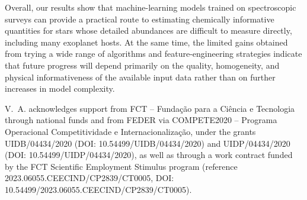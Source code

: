 \documentclass{aa}
\begin{document}
Overall, our results show that machine-learning models trained on spectroscopic surveys can provide a practical route to estimating chemically informative quantities for stars whose detailed abundances are difficult to measure directly, including many exoplanet hosts. At the same time, the limited gains obtained from trying a wide range of algorithms and feature-engineering strategies indicate that future progress will depend primarily on the quality, homogeneity, and physical informativeness of the available input data rather than on further increases in model complexity.

\begin{acknowledgements}
V.~A. acknowledges support from FCT – Funda\c{c}\~ao para a Ci\^encia e Tecnologia through national funds and from FEDER via COMPETE2020 – Programa Operacional Competitividade e Internacionalização, under the grants UIDB/04434/2020 (DOI: 10.54499/UIDB/04434/2020) and UIDP/04434/2020 (DOI: 10.54499/UIDP/04434/2020), as well as through a work contract funded by the FCT Scientific Employment Stimulus program (reference 2023.06055.CEECIND/CP2839/CT0005, DOI: 10.54499/2023.06055.CEECIND/CP2839/CT0005).
\end{acknowledgements}




%
\end{document}
